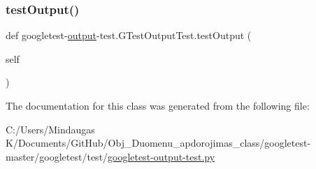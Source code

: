 \mbox{\label{classgoogletest-output-test_1_1_g_test_output_test_a4ab77925377e6c837d33f07960a31212}} 
\subsubsection{\texorpdfstring{testOutput()}{testOutput()}}
{\footnotesize\ttfamily def googletest-\/\mbox{\hyperlink{namespacegoogletest-output-test_ab3df9ce09186215a36c30454cf282417}{output}}-\/test.\+G\+Test\+Output\+Test.\+test\+Output (\begin{DoxyParamCaption}\item[{}]{self }\end{DoxyParamCaption})}



The documentation for this class was generated from the following file\+:\begin{DoxyCompactItemize}
\item 
C\+:/\+Users/\+Mindaugas K/\+Documents/\+Git\+Hub/\+Obj\+\_\+\+Duomenu\+\_\+apdorojimas\+\_\+class/googletest-\/master/googletest/test/\mbox{\hyperlink{googletest-master_2googletest_2test_2googletest-output-test_8py}{googletest-\/output-\/test.\+py}}\end{DoxyCompactItemize}
